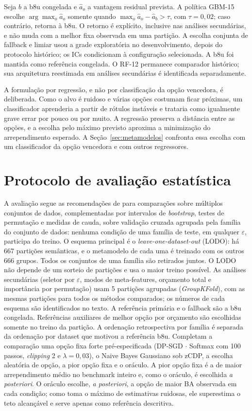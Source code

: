 Seja $b$ a b8u congelada e $\hat a_o$ a vantagem residual prevista. A política GBM-15 escolhe $\arg\max_o\hat a_o$ somente quando $\max_o\hat a_o-\hat a_b>\tau$, com $\tau=0{,}02$; caso contrário, retorna à b8u. O retorno é explícito, inclusive nas análises secundárias, e não muda com a melhor fixa observada em uma partição. A escolha conjunta de fallback e limiar usou a grade exploratória no desenvolvimento, depois do protocolo histórico; os ICs condicionam à configuração selecionada. A b8u foi mantida como referência congelada. O RF-12 permanece comparador histórico; sua arquitetura reestimada em análises secundárias é identificada separadamente.

A formulação por regressão, e não por classificação da opção vencedora, é deliberada. Como o alvo é ruidoso e várias opções costumam ficar próximas, um classificador aprenderia a partir de rótulos instáveis e trataria como igualmente grave errar por pouco ou por muito. A regressão preserva a distância entre as opções, e a escolha pelo máximo previsto aproxima a minimização do arrependimento esperado. A Seção~\ref{sec:metamodelos} confronta essa escolha com um classificador da opção vencedora e com outros regressores.

\section{Protocolo de avaliação estatística}
\label{sec:avaliacao}

A avaliação segue as recomendações de  para comparações sobre múltiplos conjuntos de dados, complementadas por intervalos de \textit{bootstrap}, testes de permutação e medidas de cauda, sobre validação cruzada agrupada pela família do conjunto de dados: nenhuma condição de uma família de teste, em qualquer $\varepsilon$, participa do treino. O esquema principal é o \textit{leave-one-dataset-out} (LODO): há 667 partições semânticas, e o metamodelo de cada uma é treinado com os outros 666 grupos. Todos os conjuntos de uma família são retirados juntos. O LODO não depende de um sorteio de partições e usa o maior treino possível. As análises secundárias (seletor por $\varepsilon$, modos de meta-features, orçamento total e importância por permutação) usam 5 partições agrupadas (\textit{GroupKFold}), com as mesmas partições para todos os métodos comparados; os números de cada esquema são identificados no texto. A referência primária e o fallback são a b8u congelada. Referências auxiliares de melhor opção por orçamento são escolhidas somente no treino da partição. A ordenação retrospectiva por família é separada da ordenação por dataset que motivou a referência b8u. Completam a comparação uma opção fixa forte pré-especificada (DP-SGD $\cdot$ Softmax com 100 passos, \textit{clipping} 2 e $\lambda = 0{,}03$), o Naive Bayes Gaussiano sob zCDP, a escolha aleatória de opção, a pior opção fixa e o oráculo. A pior opção fixa é a de maior arrependimento médio no benchmark inteiro e, como o oráculo, é escolhida \textit{a posteriori}. O oráculo escolhe, \textit{a posteriori}, a opção de maior BA observada em cada condição; como toma o máximo de estimativas ruidosas, ele superestima o teto alcançável e serve apenas como referência descritiva.


